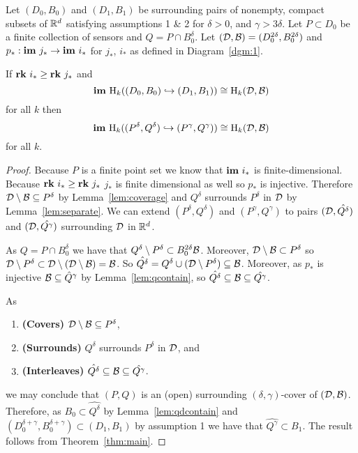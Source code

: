 \begin{theorem}\label{thm:tcc}
  Let $(D_0, B_0)$ and $(D_1, B_1)$ be surrounding pairs of nonempty, compact subsets of $\mathbb{R}^d$ satisfying assumptions 1 \& 2 for $\delta > 0$, and $\gamma > 3\delta$.
  Let $P\subset D_0$ be a finite collection of sensors and $Q = P\cap B_0^\delta$.
  Let $({\mathcal{D}}, {\mathcal{B}}) = (D_0^{2\delta}, B_0^{2\delta})$ and $p_* : \mathbf{im}~j_*\to\mathbf{im}~i_*$ for $j_*$, $i_*$ as defined in Diagram~\ref{dgm:1}.

  If $\mathbf{rk}~i_*\geq \mathbf{rk}~j_*$ and
  \[ \mathbf{im}~\mathrm{H}_k((D_0, B_0)\hookrightarrow (D_1, B_1))\cong \mathrm{H}_k({\mathcal{D}}, {\mathcal{B}}) \]
  for all $k$ then
  \[ \mathbf{im}~\mathrm{H}_k((P^\delta, Q^\delta)\hookrightarrow (P^\gamma, Q^\gamma))\cong \mathrm{H}_k({\mathcal{D}}, {\mathcal{B}}) \]
  for all $k$.
\end{theorem}
\begin{proof}
  Because $P$ is a finite point set we know that $\mathbf{im}~i_*$ is finite-dimensional.
  Because $\mathbf{rk}~i_*\geq \mathbf{rk}~j_*$ $j_*$ is finite dimensional as well so $p_*$ is injective.
  Therefore ${\mathcal{D}}\setminus{\mathcal{B}}\subseteq P^\delta$ by Lemma~\ref{lem:coverage} and $Q^\delta$ surrounds $P^\delta$ in ${\mathcal{D}}$ by Lemma~\ref{lem:separate}.
  We can extend $(P^\delta, Q^\delta)$ and $(P^\gamma, Q^\gamma)$ to pairs $({\mathcal{D}}, \hat{Q^\delta})$ and $({\mathcal{D}}, \hat{Q^\gamma})$ surrounding ${\mathcal{D}}$ in $\mathbb{R}^d$.

  As $Q = P\cap B_0^\delta$ we have that $Q^\delta\setminus P^\delta\subset B_0^{2\delta} {\mathcal{B}}$.
  Moreover, ${\mathcal{D}}\setminus{\mathcal{B}}\subset P^\delta$ so ${\mathcal{D}}\setminus P^\delta \subset {\mathcal{D}}\setminus ({\mathcal{D}}\setminus{\mathcal{B}}) = {\mathcal{B}}$.
  So $\hat{Q^\delta} = Q^\delta\cup ({\mathcal{D}}\setminus P^\delta)\subseteq {\mathcal{B}}$.
  Moreover, as $p_*$ is injective ${\mathcal{B}}\subseteq \hat{Q}^\gamma$ by Lemma~\ref{lem:qcontain}, so $\hat{Q^\delta}\subseteq {\mathcal{B}}\subseteq \hat{Q^\gamma}$.

  As
  \begin{enumerate}[label=(\alph*)]
    \item\textbf{(Covers)} ${\mathcal{D}}\setminus{\mathcal{B}} \subseteq P^\delta$,
    \item\textbf{(Surrounds)} $Q^\delta$ surrounds $P^\delta$ in ${\mathcal{D}}$, and
    \item\textbf{(Interleaves)} $\hat{Q^\delta}\subseteq {\mathcal{B}}\subseteq \hat{Q^\gamma}$.
  \end{enumerate}
  we may conclude that $(P, Q)$ is an (open) surrounding $(\delta,\gamma)$-cover of $({\mathcal{D}}, {\mathcal{B}})$.
  Therefore, as $B_0\subset \hat{Q^\delta}$ by Lemma~\ref{lem:qdcontain} and $(D_0^{\delta+\gamma}, B_0^{\delta+\gamma})\subset (D_1, B_1)$ by assumption 1 we have that $\hat{Q^\gamma}\subset B_1$.
  The result follows from Theorem~\ref{thm:main}.
\end{proof}
